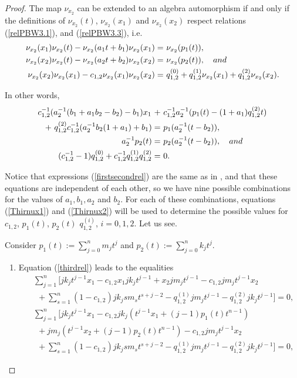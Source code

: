 \documentclass{amsart}
\theoremstyle{definition}
\theoremstyle{remark}
\numberwithin{equation}{section}
\begin{document}
\begin{proof}
The map $\nu_{x_2}$ can be extended to an algebra automorphism if and only if the definitions of $\nu_{x_2}(t)$, $\nu_{x_2}(x_1)$ and $\nu_{x_2}(x_2)$ respect relations {\rm (}\ref{relPBW3.1}{\rm )}, and {\rm (}\ref{relPBW3.3}{\rm )}, i.e.
\begin{align*}
   \nu_{x_2}(x_1)\nu_{x_2}(t)-\nu_{x_2}(a_1t+b_1)\nu_{x_2}(x_1) = &\ \nu_{x_2}(p_1(t)), \\
   \nu_{x_2}(x_2)\nu_{x_2}(t)-\nu_{x_2}(a_2t+b_2)\nu_{x_2}(x_2) = &\ \nu_{x_2}(p_2(t)),\quad {\rm and} \\
   \nu_{x_2}(x_2)\nu_{x_2}(x_1)-c_{1,2}\nu_{x_2}(x_1)\nu_{x_2}(x_2) = &\ q_{1,2}^{(0)}+q_{1,2}^{(1)}\nu_{x_2}(x_1)+q_{1,2}^{(2)}\nu_{x_2}(x_2).
\end{align*}

In other words,
\begin{align}
   c_{1,2}^{-1}(a_2^{-1}(b_1+a_1b_2-b_2)-b_1)x_1\ + &\ c_{1,2}^{-1}a_2^{-1}(p_1(t)-(1+a_1)q_{1,2}^{(2)}t) \notag\\
   +\ q_{1,2}^{(2)}c_{1,2}^{-1}(a_2^{-1}b_2(1+a_1)+b_1) = &\ p_1(a_2^{-1}(t-b_2)), \label{Firstnux2}\\
   a_{2}^{-1}p_2(t) = &\ p_2(a_{2}^{-1}(t-b_2)), \quad{\rm and} \label{Secondnux2} \\
(c_{1,2}^{-1}-1)q_{1,2}^{(0)}+c_{1,2}^{-1}q_{1,2}^{(1)}q_{1,2}^{(2)} = &\ 0. \label{Thirnux2}
\end{align}

Notice that expressions (\ref{firstsecondrel}) are the same as in \cite[Lemma 3.1]{Brzezinski2015}, and that these equations are independent of each other, so we have nine possible combinations for the values of $a_1, b_1, a_2$ and $b_2$. For each of these combinations, equations (\ref{Thirnux1}) and (\ref{Thirnux2}) will be used to determine the possible values for $c_{1,2}$, $p_1(t)$, $p_2(t)$ $q_{1,2}^{(i)}$, $i=0, 1, 2$. Let us see.

Consider $p_1(t) := \sum\limits_{j=0}^n m_jt^j$ and $p_2(t) := \sum\limits_{j=0}^n k_jt^j$.

\begin{enumerate}
    \item [\rm (a)] Equation (\ref{thirdrel}) leads to the equalities 
    \begin{align*}
        &\ \sum_{j=1}^n [jk_jt^{j-1}x_1-c_{1,2}x_1jk_jt^{j-1}+x_2jm_jt^{j-1}-c_{1,2}jm_jt^{j-1}x_2 \\
        &\ \ \ +\sum_{s=1}^{n}(1-c_{1,2})jk_jsm_st^{s+j-2} -q_{1,2}^{(1)}jm_jt^{j-1}-q_{1,2}^{(2)}jk_jt^{j-1} ] = 0, 
    \end{align*}
    \begin{align*}
        &\ \sum_{j=1}^n [jk_jt^{j-1}x_1-c_{1,2}jk_j\left(t^{j-1}x_1+(j-1)p_1(t)t^{n-1}\right)  \\
        &\ \ \ + jm_j\left(t^{j-1}x_2+(j-1)p_2(t)t^{n-1}\right)-c_{1,2}jm_jt^{j-1}x_2 \\
        &\ \ \ +\sum_{s=1}^{n}(1-c_{1,2})jk_jsm_st^{s+j-2} -q_{1,2}^{(1)}jm_jt^{j-1}-q_{1,2}^{(2)}jk_jt^{j-1} ] = 0, 
    \end{align*}


\end{enumerate}
\end{proof}
\end{document}
